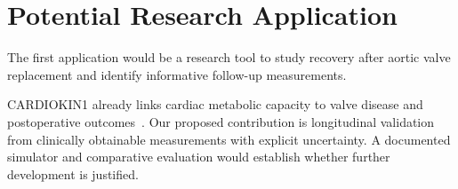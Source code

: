 \section{Potential Research Application}
The first application would be a research tool to study recovery after aortic valve replacement and identify informative follow-up measurements.

CARDIOKIN1 already links cardiac metabolic capacity to valve disease and postoperative outcomes~\cite{cardiokin2021}. Our proposed contribution is longitudinal validation from clinically obtainable measurements with explicit uncertainty. A documented simulator and comparative evaluation would establish whether further development is justified.




